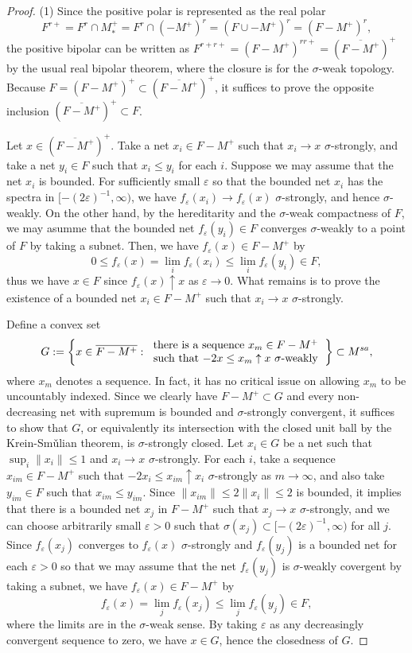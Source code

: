 \documentclass[a4paper]{amsart}
\newcommand{\e}{\varepsilon}
\theoremstyle{plain}
\theoremstyle{definition}
\begin{document}
\begin{proof}
(1)
Since the positive polar is represented as the real polar
\[F^{r+}=F^r\cap M_*^+=F^r\cap(-M^+)^r=(F\cup-M^+)^r=(F-M^+)^r,\]
the positive bipolar can be written as $F^{r+r+}=(F-M^+)^{rr+}=(\overline{F-M^+})^+$ by the usual real bipolar theorem, where the closure is for the $\sigma$-weak topology.
Because $F=(F-M^+)^+\subset(\overline{F-M^+})^+$, it suffices to prove the opposite inclusion $(\overline{F-M^+})^+\subset F$.

Let $x\in(\overline{F-M^+})^+$.
Take a net $x_i\in F-M^+$ such that $x_i\to x$ $\sigma$-strongly, and take a net $y_i\in F$ such that $x_i\le y_i$ for each $i$.
Suppose we may assume that the net $x_i$ is bounded.
For sufficiently small $\e$ so that the bounded net $x_i$ has the spectra in $[-(2\e)^{-1},\infty)$, we have $f_\e(x_i)\to f_\e(x)$ $\sigma$-strongly, and hence $\sigma$-weakly.
On the other hand, by the hereditarity and the $\sigma$-weak compactness of $F$, we may asumme that the bounded net $f_\e(y_i)\in F$ converges $\sigma$-weakly to a point of $F$ by taking a subnet.
Then, we have $f_\e(x)\in F-M^+$ by
\[0\le f_\e(x)=\lim_if_\e(x_i)\le\lim_if_\e(y_i)\in F,\]
thus we have $x\in F$ since $f_\e(x)\uparrow x$ as $\e\to0$.
What remains is to prove the existence of a bounded net $x_i\in F-M^+$ such that $x_i\to x$ $\sigma$-strongly.

Define a convex set
\[G:=\left\{x\in\overline{F-M^+}:\begin{tabular}{c}there is a sequence $x_m\in F-M^+$\\such that $-2x\le x_m\uparrow x$ $\sigma$-weakly\end{tabular}\right\}\subset M^{sa},\]
where $x_m$ denotes a sequence.
In fact, it has no critical issue on allowing $x_m$ to be uncountably indexed.
Since we clearly have $F-M^+\subset G$ and every non-decreasing net with supremum is bounded and $\sigma$-strongly convergent, it suffices to show that $G$, or equivalently its intersection with the closed unit ball by the Krein-Sm\v ulian theorem, is $\sigma$-strongly closed.
Let $x_i\in G$ be a net such that $\sup_i\|x_i\|\le1$ and $x_i\to x$ $\sigma$-strongly.
For each $i$, take a sequence $x_{im}\in F-M^+$ such that $-2x_i\le x_{im}\uparrow x_i$ $\sigma$-strongly as $m\to\infty$, and also take $y_{im}\in F$ such that $x_{im}\le y_{im}$.
Since $\|x_{im}\|\le2\|x_i\|\le2$ is bounded, it implies that there is a bounded net $x_j$ in $F-M^+$ such that $x_j\to x$ $\sigma$-strongly, and we can choose arbitrarily small $\e>0$ such that $\sigma(x_j)\subset[-(2\e)^{-1},\infty)$ for all $j$.
Since $f_\e(x_j)$ converges to $f_\e(x)$ $\sigma$-strongly and $f_\e(y_j)$ is a bounded net for each $\e>0$ so that we may assume that the net $f_\e(y_j)$ is $\sigma$-weakly covergent by taking a subnet, we have $f_\e(x)\in F-M^+$ by
\[f_\e(x)=\lim_jf_\e(x_j)\le\lim_jf_\e(y_j)\in F,\]
where the limits are in the $\sigma$-weak sense.
By taking $\e$ as any decreasingly convergent sequence to zero, we have $x\in G$, hence the closedness of $G$.



\end{proof}
\end{document}
